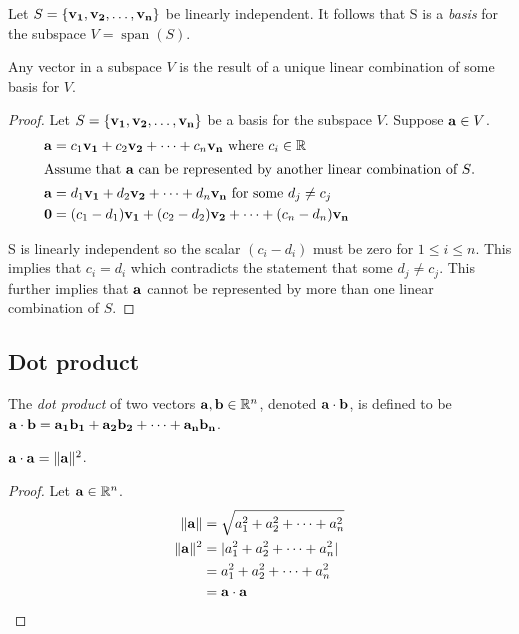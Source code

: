 \documentclass[../main.tex]{subfiles}
\begin{document}
\begin{definition}[Basis]
	Let $S = \{ \mathbf{v_1}, \mathbf{v_2}, \ldots , \mathbf{v_n} \}$ be linearly independent.
	It follows that S is a \textit{basis} for the subspace $V = \operatorname{span}(S)$.
\end{definition}

\begin{lemma}
	Any vector in a subspace $V$ is the result of a unique linear combination
	of some basis for $V$.
\end{lemma}

\begin{proof}
	Let $S = \{ \mathbf{v_1}, \mathbf{v_2}, \ldots , \mathbf{v_n} \}$
	be a basis for the subspace $V$. Suppose $\mathbf{a} \in V$.
	\begin{align*}
		\mathbf{a} & = c_1\mathbf{v_1}+c_2\mathbf{v_2} + \dots + c_n\mathbf{v_n}\ \textnormal{where}\ c_i \in \mathbb{R} \\
		\intertext{Assume that $\mathbf{a}$ can be represented by another linear combination
			of $S$.}
		\mathbf{a} & = d_1\mathbf{v_1} + d_2\mathbf{v_2} + \dots + d_n\mathbf{v_n}\ \textnormal{for some}\ d_j \neq c_j  \\
		\mathbf{0} & = (c_1-d_1)\mathbf{v_1} + (c_2-d_2)\mathbf{v_2} + \dots + (c_n-d_n)\mathbf{v_n}
	\end{align*}

	S is linearly independent so the scalar $(c_i-d_i)$ must be zero for $1 \leq i \leq n$.
	This implies that $c_i=d_i$ which contradicts the statement that some $d_j \neq c_j$.
	This further implies that $\mathbf{a}$ cannot be represented by more than
	one linear combination of $S$.
\end{proof}

\subsection{Dot product}

\begin{definition}
	The \textit{dot product} of two vectors $\mathbf{a}, \mathbf{b} \in \mathbb{R}^n$, denoted
	$\mathbf{a} \cdot \mathbf{b}$, is defined to be
	${\mathbf{a} \cdot \mathbf{b} = \mathbf{a_1}\mathbf{b_1} + \mathbf{a_2}\mathbf{b_2} + \dots + \mathbf{a_n}\mathbf{b_n}}$.
\end{definition}

\begin{lemma}
	$\mathbf{a} \cdot \mathbf{a} = \|\mathbf{a}\| ^2$.
\end{lemma}

\begin{proof}
	Let $\mathbf{a} \in \mathbb{R}^n$.
	\begin{align*}
		\|\mathbf{a}\|   & = \sqrt{a_1^2+a_2^2+\dots + a_n^2} \\
		\|\mathbf{a}\|^2 & = |a_1^2+a_2^2+\dots + a_n^2|      \\
		               & = a_1^2+a_2^2+\dots + a_n^2        \\
		               & = \mathbf{a}\cdot\mathbf{a}
	\end{align*}
\end{proof}
\end{document}
